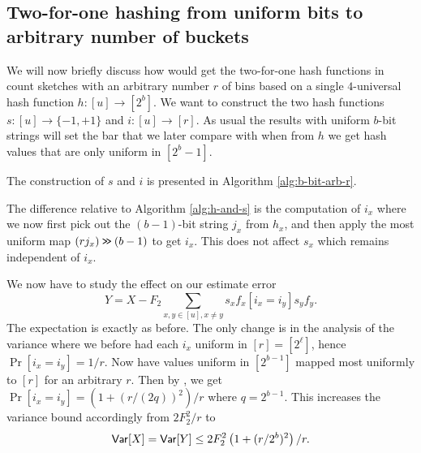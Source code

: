 \subsection{Two-for-one hashing from uniform bits to arbitrary number of buckets}
We will now briefly discuss how would get the two-for-one hash
functions in count sketches with an arbitrary number $r$ of bins based
on a single $4$-universal hash function $h:[u]\to [2^b]$.  We want to
construct the two hash functions $s:[u]\to\{-1,+1\}$ and
$i:[u]\to[r]$. As usual the results with uniform $b$-bit strings will
set the bar that we later compare with when from $h$ we get hash values that
are only uniform in $[2^b-1]$.

The construction of $s$ and $i$ is presented in 
Algorithm \ref{alg:b-bit-arb-r}.
The difference relative to Algorithm \ref{alg:h-and-s} is the computation
of $i_x$ where we now first pick out the $(b-1)$-bit string $j_x$ from
$h_x$, and then apply the most uniform map $(rj_x)\mathbin{\texttt{>\!>}} (b-1)$
to get $i_x$. This does not affect $s_x$ which remains independent
of $i_x$. 

We now have to study the effect on our estimate error
\[Y=X-F_2\sum_{x,y\in[u],x\neq y} s_x f_x[i_x=i_y]s_y f_y.\]
The expectation is exactly as before. The only
change is in the analysis of the variance where
we before had each $i_x$ uniform in $[r]=[2^\ell]$, hence
$\Pr[i_x=i_y]=1/r$. Now have values uniform in $[2^{b-1}]$ mapped
most uniformly to $[r]$ for an arbitrary $r$. Then by ,
we get $\Pr[i_x=i_y]=\left(1+(r/(2q))^2\right)/r$ where $q=2^{b-1}$. 
This increases
the variance bound accordingly from $2F_2^2/r$ to
\begin{equation}\label{eq:Var-b-bit-arb-r}
   {\sf Var}[X]={\sf Var}[Y]\leq 2F_2^2\left(1+(r/2^b)^2\right)/r.
\end{equation}

